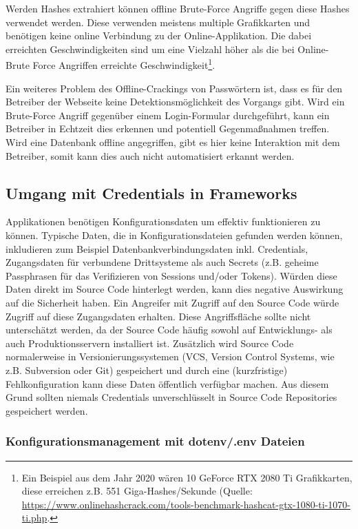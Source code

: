 Werden Hashes extrahiert können offline Brute-Force Angriffe gegen diese Hashes verwendet werden. Diese verwenden meistens multiple Grafikkarten und benötigen keine online Verbindung zu der Online-Applikation. Die dabei erreichten Geschwindigkeiten sind um eine Vielzahl höher als die bei Online-Brute Force Angriffen erreichte Geschwindigkeit\footnote{Ein Beispiel aus dem Jahr 2020 wären 10 GeForce RTX 2080 Ti Grafikkarten, diese erreichen z.B. 551 Giga-Hashes/Sekunde (Quelle: \url{https://www.onlinehashcrack.com/tools-benchmark-hashcat-gtx-1080-ti-1070-ti.php}.}.

Ein weiteres Problem des Offline-Crackings von Passwörtern ist, dass es für den Betreiber der Webseite keine Detektionsmöglichkeit des Vorgangs gibt. Wird ein Brute-Force Angriff gegenüber einem Login-Formular durchgeführt, kann ein Betreiber in Echtzeit dies erkennen und potentiell Gegenmaßnahmen treffen. Wird eine Datenbank offline angegriffen, gibt es hier keine Interaktion mit dem Betreiber, somit kann dies auch nicht automatisiert erkannt werden.

\subsection{Umgang mit Credentials in Frameworks}

Applikationen benötigen Konfigurationsdaten um effektiv funktionieren zu können. Typische Daten, die in Konfigurationsdateien gefunden werden können, inkludieren zum Beispiel Datenbankverbindungsdaten inkl. Credentials, Zugangsdaten für verbundene Drittsysteme als auch Secrets (z.B. geheime Passphrasen für das Verifizieren von Sessions und/oder Tokens). Würden diese Daten direkt im Source Code hinterlegt werden, kann dies negative Auswirkung auf die Sicherheit haben. Ein Angreifer mit Zugriff auf den Source Code würde Zugriff auf diese Zugangsdaten erhalten. Diese Angriffsfläche sollte nicht unterschätzt werden, da der Source Code häufig sowohl auf Entwicklungs- als auch Produktionsservern installiert ist. Zusätzlich wird Source Code normalerweise in Versionierungssystemen (VCS, Version Control Systems, wie z.B. Subversion oder Git) gespeichert und durch eine (kurzfristige) Fehlkonfiguration kann diese Daten öffentlich verfügbar machen. Aus diesem Grund sollten niemals Credentials unverschlüsselt in Source Code Repositories gespeichert werden.

\subsubsection{Konfigurationsmanagement mit dotenv/.env Dateien}

